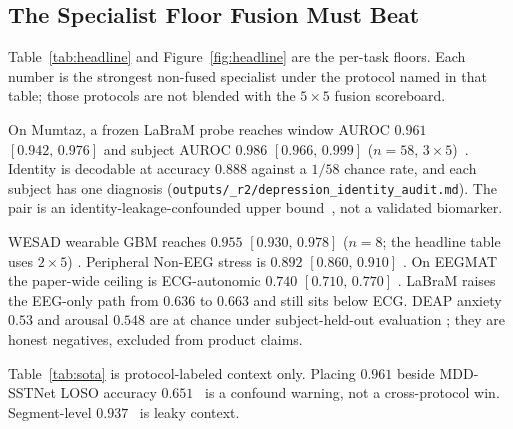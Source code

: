 \subsection{The Specialist Floor Fusion Must Beat}
\label{subsec:mentalhealth}

Table~\ref{tab:headline} and Figure~\ref{fig:headline} are the per-task floors. Each number is the
strongest non-fused specialist under the protocol named in that table; those protocols are not
blended with the $5\times5$ fusion scoreboard.

On Mumtaz, a frozen LaBraM probe reaches window AUROC $0.961$ $[0.942,\,0.976]$ and subject AUROC
$0.986$ $[0.966,\,0.999]$ ($n=58$, $3\times5$)~\cite{mumtaz2016}. Identity is decodable at
accuracy $0.888$ against a $1/58$ chance rate, and each subject has one diagnosis
(\texttt{outputs/\_r2/depression\_identity\_audit.md}). The pair is an
identity-leakage-confounded upper bound~\cite{lin2026identity}, not a validated biomarker.

WESAD wearable GBM reaches $0.955$ $[0.930,\,0.978]$ ($n=8$; the headline table uses $2\times5$)
\cite{wesad}. Peripheral Non-EEG stress is $0.892$ $[0.860,\,0.910]$ \cite{noneeg}. On EEGMAT the
paper-wide ceiling is ECG-autonomic $0.740$ $[0.710,\,0.770]$ \cite{eegmat}. LaBraM raises the
EEG-only path from $0.636$ to $0.663$ and still sits below ECG. DEAP anxiety $0.53$ and arousal
$0.548$ are at chance under subject-held-out evaluation \cite{deap}; they are honest negatives,
excluded from product claims.

Table~\ref{tab:sota} is protocol-labeled context only. Placing $0.961$ beside MDD-SSTNet LOSO
accuracy $0.651$~\cite{mddsstnet} is a confound warning, not a cross-protocol win. Segment-level
$0.937$~\cite{yan2022mdd} is leaky context.

